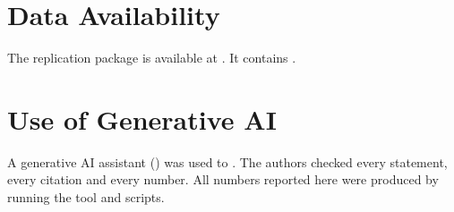 \section*{Data Availability}
\label{sec:data}
The replication package is available at . It contains
.

\section*{Use of Generative AI}
 A generative AI assistant ()
was used to . The authors checked every statement, every citation
and every number. All numbers reported here were produced by running the
tool and scripts.
